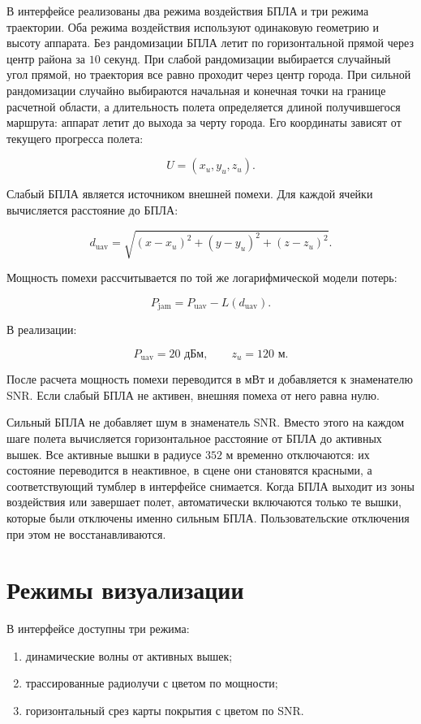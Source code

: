 \documentclass[12pt,a4paper]{article}
\begin{document}
В интерфейсе реализованы два режима воздействия БПЛА и три режима траектории. Оба режима воздействия используют одинаковую геометрию и высоту аппарата. Без рандомизации БПЛА летит по горизонтальной прямой через центр района за $10$ секунд. При слабой рандомизации выбирается случайный угол прямой, но траектория все равно проходит через центр города. При сильной рандомизации случайно выбираются начальная и конечная точки на границе расчетной области, а длительность полета определяется длиной получившегося маршрута: аппарат летит до выхода за черту города. Его координаты зависят от текущего прогресса полета:

\[
U = (x_u, y_u, z_u).
\]

Слабый БПЛА является источником внешней помехи. Для каждой ячейки вычисляется расстояние до БПЛА:

\[
d_{\text{uav}} =
\sqrt{(x - x_u)^2 + (y - y_u)^2 + (z - z_u)^2}.
\]

Мощность помехи рассчитывается по той же логарифмической модели потерь:

\[
P_{\text{jam}} = P_{\text{uav}} - L(d_{\text{uav}}).
\]

В реализации:

\[
P_{\text{uav}} = 20\text{ дБм}, \qquad z_u = 120\text{ м}.
\]

После расчета мощность помехи переводится в мВт и добавляется к знаменателю SNR. Если слабый БПЛА не активен, внешняя помеха от него равна нулю.

Сильный БПЛА не добавляет шум в знаменатель SNR. Вместо этого на каждом шаге полета вычисляется горизонтальное расстояние от БПЛА до активных вышек. Все активные вышки в радиусе $352$ м временно отключаются: их состояние переводится в неактивное, в сцене они становятся красными, а соответствующий тумблер в интерфейсе снимается. Когда БПЛА выходит из зоны воздействия или завершает полет, автоматически включаются только те вышки, которые были отключены именно сильным БПЛА. Пользовательские отключения при этом не восстанавливаются.

\section{Режимы визуализации}

В интерфейсе доступны три режима:

\begin{enumerate}
    \item динамические волны от активных вышек;
    \item трассированные радиолучи с цветом по мощности;
    \item горизонтальный срез карты покрытия с цветом по SNR.
\end{enumerate}
\end{document}
